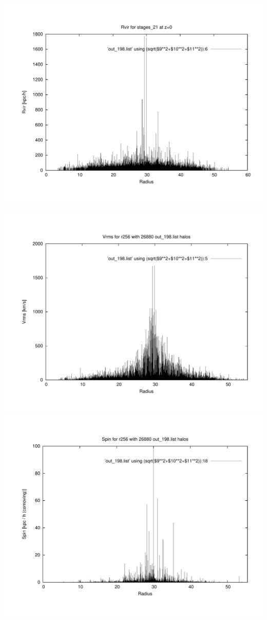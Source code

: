 \includegraphics[scale=0.3]{r256/h100/stages_21/plot_rvir_z0.pdf}

\includegraphics[scale=0.3]{r256/h100/stages_21/plot_Vrms_out_198.pdf}
\includegraphics[scale=0.3]{r256/h100/stages_21/plot_spin_out_198.pdf}

